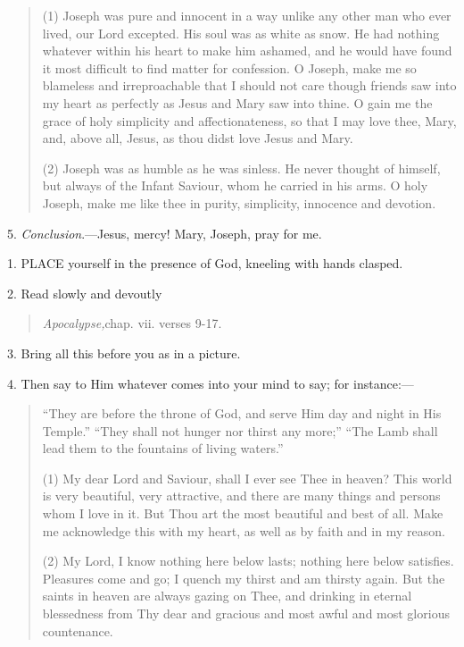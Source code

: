 \begin{quote}

(1) Joseph was pure and
innocent in a way unlike any other man who ever lived, our Lord
excepted. His soul was as white as snow. He had nothing whatever
within his heart to make him ashamed, and he would have found it most
difficult to find matter for confession. O Joseph, make me so
blameless and irreproachable that I should not care though friends saw
into my heart as perfectly as Jesus and Mary saw into thine. O gain me
the grace of holy simplicity and affectionateness, so that I may love
thee, Mary, and, above all, Jesus, as thou didst love Jesus and Mary.

(2) Joseph was as humble as he
was sinless. He never thought of himself, but always of the
Infant Saviour, whom he carried in his arms. O holy Joseph, make me
like thee in purity, simplicity, innocence and devotion.

\end{quote}

5. \emph{Conclusion}.—Jesus,
mercy! Mary, Joseph, pray for me.


1. PLACE
yourself in the presence of God, kneeling with hands clasped.

2. Read slowly and devoutly

\begin{quote}

\emph{Apocalypse,}chap.
vii. verses 9-17.

\end{quote}

3. Bring all this before you as
in a picture.

4. Then say to Him whatever
comes into your mind to say; for instance:—

\begin{quote}

``They
are before the throne of God, and serve Him day and night in His
Temple.'' ``They shall not hunger nor thirst any more;'' ``The Lamb shall
lead them to the fountains of living waters.''

(1) My dear Lord and Saviour,
shall I ever see Thee in heaven? This world is very beautiful, very
attractive, and there are many things and persons whom I love in it.
But Thou art the most beautiful and best of all. Make me acknowledge
this with my heart, as well as by faith and in my reason.

(2) My Lord, I know nothing
here below lasts; nothing here below satisfies. Pleasures come and go;
I quench my thirst and am thirsty again. But the saints in
heaven are always gazing on Thee, and drinking in eternal blessedness
from Thy dear and gracious and most awful and most glorious
countenance.

\end{quote}

